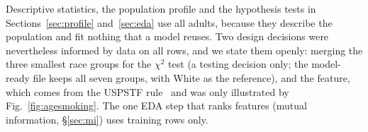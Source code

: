 Descriptive statistics, the population profile and the hypothesis tests in Sections~\ref{sec:profile} and~\ref{sec:eda} use all adults, because they describe the population and fit nothing that a model reuses. Two design decisions were nevertheless informed by data on all rows, and we state them openly: merging the three smallest race groups for the $\chi^2$ test (a testing decision only; the model-ready file keeps all seven groups, with White as the reference), and the  feature, which comes from the USPSTF rule~\cite{uspstf} and was only illustrated by Fig.~\ref{fig:agesmoking}. The one EDA step that ranks features (mutual information, \S\ref{sec:mi}) uses training rows only.
